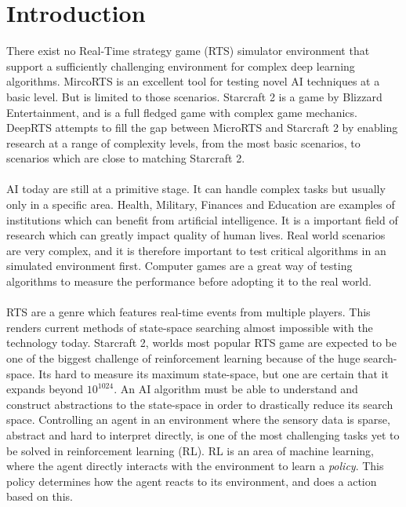 \documentclass[fleqn,10pt]{article} %
\begin{document}
\section{Introduction} %
There exist no Real-Time strategy game (RTS) simulator environment that support a sufficiently challenging environment for complex deep learning algorithms. MircoRTS is an excellent tool for testing novel AI techniques at a basic level. But is limited to those scenarios. Starcraft 2 is a game by Blizzard Entertainment, and is a full fledged game with complex game mechanics. DeepRTS attempts to fill the gap between MicroRTS and Starcraft 2 by enabling research at a range of complexity levels, from the most basic scenarios, to scenarios which are close to matching Starcraft 2.
\\
\\
AI today are still at a primitive stage. It can handle complex tasks but usually only in a specific area. Health, Military, Finances and Education are examples of institutions which can benefit from artificial intelligence. It is a important field of research which can greatly impact quality of human lives. Real world scenarios are very complex, and it is therefore important to test critical algorithms in an simulated environment first. Computer games are a great way of testing algorithms to measure the performance before adopting it to the real world.
\\
\\
RTS are a genre which features real-time events from multiple players. This renders current methods of state-space searching almost impossible with the technology today. Starcraft 2, worlds most popular RTS game are expected to be one of the biggest challenge of reinforcement learning because of the huge search-space. Its hard to measure its maximum state-space, but one are certain that it expands beyond $10^{1024}$. An AI algorithm must be able to understand and construct abstractions to the state-space in order to drastically reduce its search space.
Controlling an agent in an environment where the sensory data is sparse, abstract and hard to interpret directly, is one of the most challenging tasks yet to be solved in reinforcement learning (RL). RL is an area of machine learning, where the agent directly interacts  with the environment to learn a \textit{policy}. This policy determines how the agent reacts to its environment, and does a action based on this.
\end{document}
